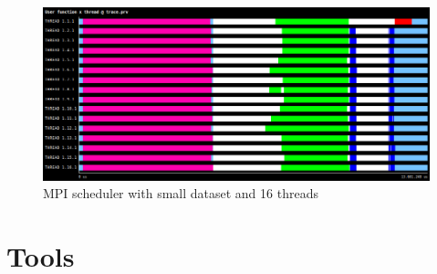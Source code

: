 \begin{figure}[h]
\includegraphics[width=\textwidth]{traces/mpi_16_small.png}
\caption{MPI scheduler with small dataset and 16 threads}
\label{tra:mpi16small}
\end{figure}

\section{Tools}